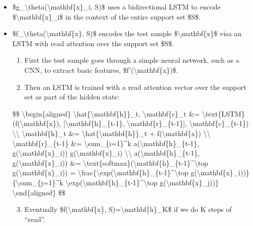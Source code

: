 \begin{itemize}
\item
  \$g\_\textbackslash theta(\textbackslash mathbf\{x\}\_i, S)\$ uses a bidirectional LSTM to encode \$\textbackslash mathbf\{x\}\_i\$ in the context of the entire support set \$S\$.
\item
  \$f\_\textbackslash theta(\textbackslash mathbf\{x\}, S)\$ encodes the test sample \$\textbackslash mathbf\{x\}\$ visa an LSTM with read attention over the support set \$S\$.

  \begin{enumerate}
  \tightlist
  \item
    First the test sample goes through a simple neural network, such as a CNN, to extract basic features, \$f'(\textbackslash mathbf\{x\})\$.
  \item
    Then an LSTM is trained with a read attention vector over the support set as part of the hidden state:\\
  \end{enumerate}

  \$\$ \textbackslash begin\{aligned\} \textbackslash hat\{\textbackslash mathbf\{h\}\}\_t, \textbackslash mathbf\{c\}\_t \&= \textbackslash text\{LSTM\}(f\textquotesingle(\textbackslash mathbf\{x\}), {[}\textbackslash mathbf\{h\}\_\{t-1\}, \textbackslash mathbf\{r\}\_\{t-1\}{]}, \textbackslash mathbf\{c\}\_\{t-1\}) \textbackslash\textbackslash{} \textbackslash mathbf\{h\}\_t \&= \textbackslash hat\{\textbackslash mathbf\{h\}\}\_t + f\textquotesingle(\textbackslash mathbf\{x\}) \textbackslash\textbackslash{} \textbackslash mathbf\{r\}\_\{t-1\} \&= \textbackslash sum\_\{i=1\}\^{}k a(\textbackslash mathbf\{h\}\_\{t-1\}, g(\textbackslash mathbf\{x\}\_i)) g(\textbackslash mathbf\{x\}\_i) \textbackslash\textbackslash{} a(\textbackslash mathbf\{h\}\_\{t-1\}, g(\textbackslash mathbf\{x\}\_i)) \&= \textbackslash text\{softmax\}(\textbackslash mathbf\{h\}\_\{t-1\}\^{}\textbackslash top g(\textbackslash mathbf\{x\}\_i)) = \textbackslash frac\{\textbackslash exp(\textbackslash mathbf\{h\}\_\{t-1\}\^{}\textbackslash top g(\textbackslash mathbf\{x\}\_i))\}\{\textbackslash sum\_\{j=1\}\^{}k \textbackslash exp(\textbackslash mathbf\{h\}\_\{t-1\}\^{}\textbackslash top g(\textbackslash mathbf\{x\}\_j))\} \textbackslash end\{aligned\} \$\$

  \begin{enumerate}
  \setcounter{enumi}{2}
  \tightlist
  \item
    Eventually \$f(\textbackslash mathbf\{x\}, S)=\textbackslash mathbf\{h\}\_K\$ if we do K steps of ``read''.
  \end{enumerate}
\end{itemize}

